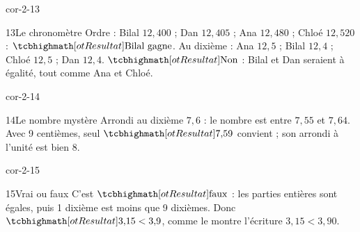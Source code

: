 \begin{blocLivre}{cor-2-13}\begin{corrige}{13}{Le chronomètre}
Ordre : Bilal $12{,}400$ ; Dan $12{,}405$ ; Ana $12{,}480$ ; Chloé $12{,}520$ : $\res{\text{Bilal gagne}}$. Au dixième : Ana $12{,}5$ ; Bilal $12{,}4$ ; Chloé $12{,}5$ ; Dan $12{,}4$. $\res{\text{Non}}$ : Bilal et Dan seraient à égalité, tout comme Ana et Chloé.
\end{corrige}\end{blocLivre}
\begin{blocLivre}{cor-2-14}\begin{corrige}{14}{Le nombre mystère}
Arrondi au dixième $7{,}6$ : le nombre est entre $7{,}55$ et $7{,}64$. Avec 9 centièmes, seul $\res{7{,}59}$ convient ; son arrondi à l’unité est bien 8.
\end{corrige}\end{blocLivre}
\begin{blocLivre}{cor-2-15}\begin{corrige}{15}{Vrai ou faux}
C’est $\res{\text{faux}}$ : les parties entières sont égales, puis 1 dixième est moins que 9 dixièmes. Donc $\res{3{,}15<3{,}9}$, comme le montre l’écriture $3{,}15<3{,}90$.
\end{corrige}\end{blocLivre}

